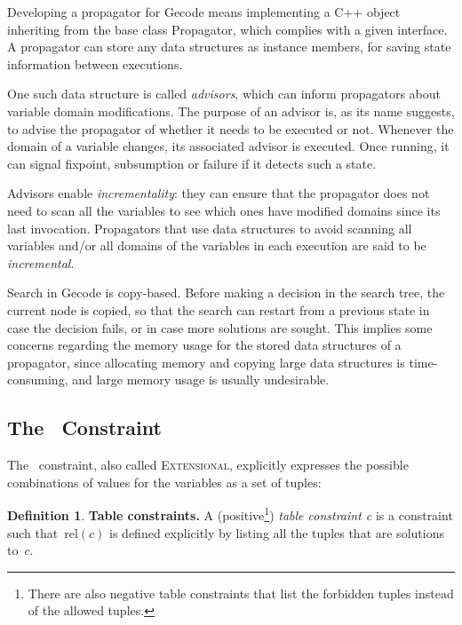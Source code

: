 \documentclass[a4paper,11pt]{article}
\theoremstyle{definition}
\newtheorem{definition}{Definition}
\newcommand{\Table}{\Constraint{Table}}
\newcommand{\Extensional}{\Constraint{Extensional}~}
\newcommand{\Relation}[1]{\text{rel}({#1})}
\def\Extensional{\textsc{Extensional}}
\numberwithin{equation}{section}
\begin{document}
Developing a propagator for Gecode means implementing a C++ object
inheriting from the base class Propagator,
which complies with a given interface.
A propagator can store any data structures as instance members,
for saving state information between executions.

One such data structure is called \emph{advisors},
which can inform propagators about variable domain
modifications.
The purpose of an advisor is, as its name suggests, to advise
the propagator of whether it needs to be executed or not.
Whenever the domain of a variable changes, its associated advisor is executed.
Once running, it can signal fixpoint, subsumption or failure if it detects
such a state.

Advisors enable \emph{incrementality}: they can ensure
that the propagator does not need to scan all the variables to see
which ones have modified domains since its last invocation. Propagators that use
data structures to avoid scanning all variables and/or all domains
of the variables in each execution are said to be \emph{incremental}.

Search in Gecode is copy-based. Before making a decision in the search tree, the
current node is copied, so that the search can restart from a previous
state in case the decision fails, or in case more solutions are sought.
This implies some concerns regarding the memory usage for the stored data structures
of a propagator, since allocating memory and copying large data structures
is time-consuming, and large memory usage is usually undesirable.




\subsection{The \Table~Constraint}
\label{bg:table}
The \Table~constraint, also called \Extensional,
explicitly expresses the possible combinations of values for the variables as a
set of tuples:

\begin{definition}
  \textbf{Table constraints.} A
  (positive\footnote{There are also negative table constraints that list the
    forbidden tuples instead of the allowed tuples.})
  \emph{table constraint c} is a
  constraint such that~$\Relation{c}$ is defined explicitly by listing all the
  tuples that are solutions to~$c$.
\end{definition}
\end{document}
